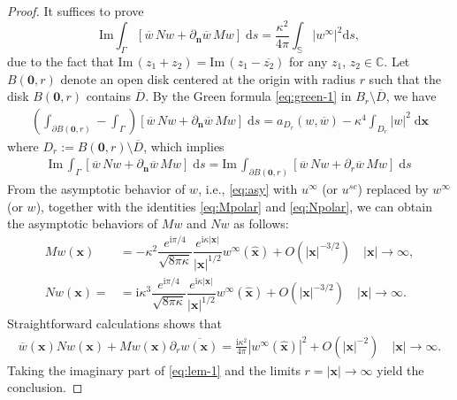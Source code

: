 \documentclass[10pt,a4paper]{amsart}
\begin{document}
\begin{proof}
  It suffices to prove
\begin{equation*}
    \mathrm{Im} \int_{\Gamma}[\overline{w}\, N w +  \partial_{\bm{n}}\overline{w}\, M w] \;\mathrm{d}s
    = \frac{\kappa^{2}}{4\pi}\int_{\mathbb{S}}|w^{\infty}|^{2}\mathrm{d}s,
  \end{equation*}
  due to the fact that $\mathrm{Im}\,(z_1+z_2)=\mathrm{Im}\, (z_1-\overline{z_{2}})$ for any $z_1$, $z_2 \in \mathbb{C}$.
  Let  $B(\bm{ 0 },r)$ denote an open disk  centered at the origin with radius  $r$  such that the disk $B(\bm{ 0 },r)$ contains $\overline{D}$.
  By the Green formula \eqref{eq:green-1} in $B_r\setminus \overline{D}$, we have
 \begin{align*}  %
   \left( \int_{\partial B(\bm{ 0 },r)}- \int_{\Gamma}\right)
   [\overline{w}\, N w + \partial_{\bm{n}}\overline{w} \, M w]\;\mathrm{d}s
   = a_{D_r}(w,\overline{w}) - \kappa^4  \int_{D_r}| w | ^2\;\mathrm{d} \bm{ x }
\end{align*}
  where $D_r:=B(\bm{ 0 },r)\setminus \overline{D}$, which implies 
  \begin{align}  \label{eq:lem-1}
   \mathrm{Im}\, \int_{\Gamma}[\overline{w}\, N w + \partial_{\bm{n}}\overline{w} \, M w]\;\mathrm{d}s
     =\mathrm{Im}\, \int_{\partial B(\bm{ 0 },r)}[\overline{w}\, N w +\partial_{r}\overline{w} \,   M w]\;\mathrm{d}s 
  \end{align}
From the asymptotic behavior of $w$, i.e., \eqref{eq:asy} with $u^{\infty}$ (or $u^{sc}$) replaced by $w^{\infty}$ (or $w$),
together with the identities \eqref{eq:Mpolar} and \eqref{eq:Npolar},
we can obtain the asymptotic behaviors of $M w$ and $N w$ as
follows:
\begin{align*}
  M w \left( \bm{ x } \right)
  &= -\kappa^2  \dfrac{e^{\mathrm{i} \pi/4   }}{\sqrt{8\pi \kappa}}
        \dfrac{e^{\mathrm{i}\kappa | \bm{x} | }}{| \bm{ x }  |^{1/2} } w^{\infty} \left( \hat{\bm{ x }} \right)
        + O \left( | \bm{ x } |^{-3/2}   \right) \quad | \bm{ x }  |\to \infty, \\
  N w \left( \bm{ x } \right) =& = \mathrm{ i } \kappa^3  \dfrac{e^{\mathrm{i} \pi/4   }}{\sqrt{8\pi \kappa}}
                                 \dfrac{e^{\mathrm{i}\kappa | \bm{x} | }}{| \bm{ x }  |^{1/2} } w^{\infty} \left( \hat{\bm{ x }} \right)
                                  + O \left( | \bm{ x } |^{-3/2}   \right) \quad | \bm{ x }  |\to \infty.
\end{align*}
Straightforward calculations shows that
\begin{align*}
  \overline{w}\left(\bm{ x } \right) N w\left(\bm{ x  }\right)
  + M w\left(\bm{ x } \right) \partial_{r}\overline{w\left(\bm{ x } \right)} =
  \frac{\mathrm{ i }  \kappa^{2}}{4\pi} |w^{\infty} \left( \hat{\bm{ x }} \right) |^2
  + O \left( | \bm{ x } |^{-2}\right) \quad  | \bm{ x }  |\to \infty.
\end{align*}
Taking the imaginary part of \eqref{eq:lem-1} and the limits $r=| \bm{ x } | \to \infty$ yield the conclusion.
\end{proof}
\end{document}
